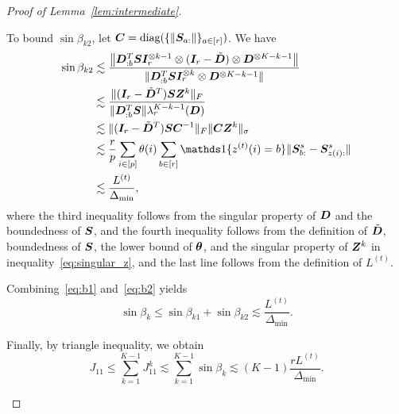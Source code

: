 \documentclass[journal]{IEEEtran}
\theoremstyle{definition}
\theoremstyle{definition}
\def\fixme#1#2{\textbf{\color{red}[FIXME (#1): #2]}}
\begin{document}
\begin{proof}[Proof of Lemma~\ref{lem:intermediate}]
\begin{enumerate}[wide]
    To bound $\sin \beta_{k2}$, let $\bm C = \text{diag}(\{\lVert\bm S_{a:}\rVert\}_{a \in [r]})$. We have 
    \begin{align}
        \sin \beta_{k2} &\lesssim \frac{ \onorm{\mD_{:b}^{T} \mS \mI_r^{\otimes k-1} \otimes (\mI_r - \tilde \mD) \otimes \mD^{\otimes K-k-1} } }{\onormSize{}{\mD_{:b}^{T} \mS \mI_r^{\otimes k} \otimes \mD^{\otimes K-k-1} }  }\\
        & \lesssim \frac{ \onormSize{}{(\mI_r - \tilde \mD^T) \mS \mZ^k}_F }{\onormSize{}{\mD_{:b}^{T} \mS} \lambda_r^{K-k-1}(\mD)} \\
        & \lesssim \onormSize{ }{(\mI_r - \tilde \mD^T) \mS \mC^{-1}}_F \onormSize{}{\mC \mZ^k}_{\sigma}\\
        & \lesssim \frac{r}{p} \sum_{i \in [p]} \theta(i) \sum_{b \in [r]} \ind\{z^{(t)}(i) = b\} \onormSize{}{\mS_{b:}^s - \mS_{z(i):}^s} \\
        & \lesssim \frac{L^{(t)}}{\Delta_{\min}}, \label{eq:b2} %
    \end{align}
    where the third inequality follows from the singular property of $\bm{D}$ and the boundedness of $\bm S$, and the fourth inequality follows from the definition of $\tilde {\bm{D}}$, boundedness of $\bm S$, the lower bound of $\boldsymbol{\theta}$, and the singular property of $\bm Z^k$ in inequality~\eqref{eq:singular_z}, and the last line follows from the definition of $L^{(t)}$.
    
  Combining~\eqref{eq:b1} and~\eqref{eq:b2} yields
    \begin{equation}
        \sin \beta_k \leq \sin \beta_{k1} + \sin \beta_{k2} \lesssim \frac{L^{(t)}}{\Delta_{\min}}.
    \end{equation}

    
       Finally, by triangle inequality, we obtain
    \begin{equation}\label{eq:j1}
        J_{11} \leq \sum_{k = 1}^{K-1} J_{11}^k \lesssim  \sum_{k = 1}^{K-1} \sin \beta_k  \lesssim (K-1)\frac{r L^{(t)}}{\Delta_{\min}}.
    \end{equation}
    


\end{enumerate}
\end{proof}
\end{document}
